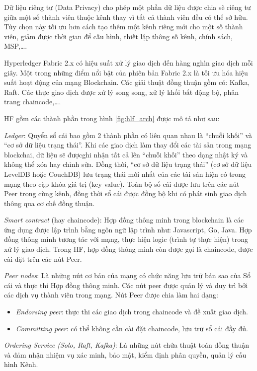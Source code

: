 Dữ liệu riêng tư (Data Privacy) cho phép một phần dữ liệu được chia sẽ riêng tư giữa một số thành viên thuộc kênh thay vì tất cả thành viên đều có thể sở hữu. 
Tùy chọn này tối ưu hơn cách tạo thêm một kênh riêng mới cho một số thành viên, giảm được thời gian để cấu hình, thiết lập thông số kênh, chính sách, MSP,\ldots. 

Hyperledger Fabric 2.x có hiệu suất xử lý giao dịch đến hàng nghìn giao dịch mỗi giây. 
Một trong những điểm nổi bật của phiên bản Fabric 2.x là tối ưu hóa hiệu suất hoạt động của mạng Blockchain. 
Các giải thuật đồng thuận gồm có: Kafka, Raft. 
Các thực giao dịch được xử lý song song, xử lý khối bất động bộ, phân trang chaincode,\ldots.

HF gồm các thành phần trong hình \ref{fig:hlf_arch} được mô tả như sau:

\emph{Ledger}: Quyển sổ cái bao gồm 2 thành phần có liên quan nhau là “chuỗi khối” và “cơ sở dữ liệu trạng thái”.
Khi các giao dịch làm thay đổi các tài sản trong mạng blockchai, dữ liệu sẽ đượcghi nhận tất cả lên “chuỗi khối” theo dạng nhật ký và không thể xóa hay chỉnh sửa. 
Đồng thời, “cơ sở dữ liệu trạng thái” (cơ sở dữ liệu LevelDB hoặc CouchDB) lưu trạng thái mới nhất của các tài sản hiện có trong mạng theo cặp khóa-giá trị (key-value).
Toàn bộ sổ cái được lưu trên các nút Peer trong cùng kênh, đồng thời sổ cái được đồng bộ khi có phát sinh giao dịch thông qua cơ chế đồng thuận.

\emph{Smart contract} (hay chaincode): Hợp đồng thông minh trong blockchain là các ứng dụng được lập trình bằng ngôn ngữ lập trình như: Javascript, Go, Java. 
Hợp đồng thông minh tương tác với mạng, thực hiện logic (trình tự thực hiện) trong xử lý giao dịch.
Trong HF, hợp đồng thông minh còn được gọi là chaincode, được cài đặt trên các nút Peer.

\emph{Peer nodes}: Là những nút cơ bản của mạng có chức năng lưu trữ bản sao của Sổ cái và thực thi Hợp đồng thông minh. 
Các nút peer được quản lý và duy trì bởi các dịch vụ thành viên trong mạng. Nút Peer được chia làm hai dạng:

\begin{itemize}
\item \emph{Endorsing peer}: thực thi các giao dịch trong chaincode và đề xuất giao dịch.
\item \emph{Committing peer}: có thể không cần cài đặt chaincode, lưu trữ sổ cái đầy đủ.
\end{itemize}

\emph{Ordering Service (Solo, Raft, Kafka)}: Là những nút chứa thuật toán đồng thuận và đảm nhận nhiệm vụ xác minh, bảo mật, kiểm định phân quyền, quản lý cấu hình Kênh.

